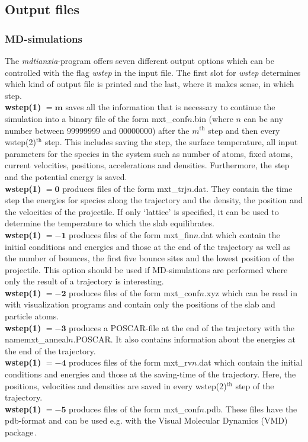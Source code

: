 \documentclass[twoside, 11pt, titlepage, captions=nooneline, a4paper, headsepline]{scrbook}%
\newcommand{\9}{\mathrm}
\newcommand{\0}{\,\mathrm}
\begin{document}
\subsection{Output files}
\label{Sec:mxt:output}
\subsubsection{MD-simulations}
The \textit{mdtianxia}-program offers seven different output options which can be controlled with the flag \textit{wstep} in the input file. The first slot for \textit{wstep} determines which kind of output file is printed and the last, where it makes sense, in which step.
\\
\textbf{wstep(1)} $\mathbf{=m}$ saves all the information that is necessary to continue the simulation into a binary file of the form mxt\_conf$n$.bin (where $n$ can be any number between 99999999 and 00000000) after the $m^\mathrm{th}$ step and then every wstep(2)$^\mathrm{th}$ step. This includes saving the step, the surface temperature, all input parameters for the species in the system such as number of atoms, fixed atoms, current velocities, positions, accelerations and densities. Furthermore, the step and the potential energy is saved.\\
\textbf{wstep(1)} $\mathbf{=0}$ produces files of the form mxt\_trj$n$.dat. They contain the time step the energies for species along the trajectory and the density, the position and the velocities of the projectile. If only `lattice' is specified, it can be used to determine the temperature to which the slab equilibrates.\\
\textbf{wstep(1)} $\mathbf{=-1}$ produces files of the form mxt\_fin$n$.dat which contain the initial conditions and energies and those at the end of the trajectory as well as the number of bounces, the first five bounce sites and the lowest position of the projectile. This option should be used if MD-simulations are performed where only the result of a trajectory is interesting.\\ 
\textbf{wstep(1)} $\mathbf{=-2}$ produces files of the form mxt\_conf$n$.xyz which can be read in with visualization programs and contain only the positions of the slab and particle atoms.\\
\textbf{wstep(1)} $\mathbf{=-3}$ produces a POSCAR-file at the end of the trajectory with the name\linebreak mxt\_anneal$n$.POSCAR. It also contains information about the energies at the end of the trajectory.\\
\textbf{wstep(1)} $\mathbf{=-4}$ produces files of the form mxt\_rv$n$.dat which contain the initial conditions and energies and those at the saving-time of the trajectory. Here, the positions, velocities and densities are saved in every wstep(2)$^\mathrm{th}$ step of the trajectory.\\
\textbf{wstep(1)} $\mathbf{=-5}$ produces files of the form mxt\_conf$n$.pdb. These files have the pdb-format and can be used e.g. with the Visual Molecular Dynamics (VMD) package\,\cite{humphrey1996}.
\end{document}
